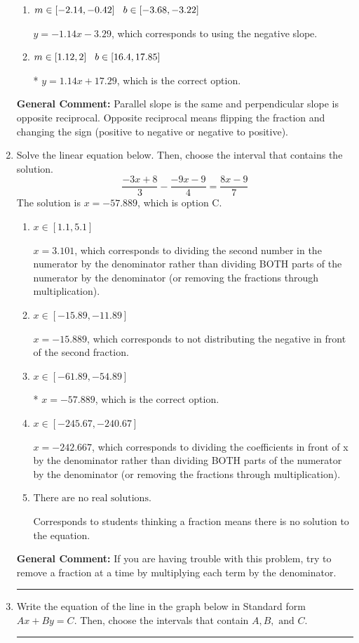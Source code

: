 \documentclass{extbook}[14pt]
\newcommand{\litem}[1]{\item #1

\rule{\textwidth}{0.4pt}}
\begin{document}
\begin{enumerate}
{\begin{enumerate}[label=\Alph*.]
 $y = 0.88x + 17.29$, which corresponds to using the reciprocal slope $(1/m)$.
\item \( m \in [-2.14, -0.42] \hspace*{3mm} b \in [-3.68, -3.22] \)

 $y = -1.14x - 3.29$, which corresponds to using the negative slope.
\item \( m \in [1.12, 2] \hspace*{3mm} b \in [16.4, 17.85] \)

* $y = 1.14x + 17.29$, which is the correct option.
\end{enumerate}

\textbf{General Comment:} Parallel slope is the same and perpendicular slope is opposite reciprocal. Opposite reciprocal means flipping the fraction and changing the sign (positive to negative or negative to positive).
}
\litem{
Solve the linear equation below. Then, choose the interval that contains the solution.
\[ \frac{-3x + 8}{3} - \frac{-9x -9}{4} = \frac{8x -9}{7} \]
The solution is \( x = -57.889 \), which is option C.\begin{enumerate}[label=\Alph*.]
\item \( x \in [1.1, 5.1] \)

 $x = 3.101$, which corresponds to dividing the second number in the numerator by the denominator rather than dividing BOTH parts of the numerator by the denominator (or removing the fractions through multiplication).
\item \( x \in [-15.89, -11.89] \)

 $x = -15.889$, which corresponds to not distributing the negative in front of the second fraction.
\item \( x \in [-61.89, -54.89] \)

* $x = -57.889$, which is the correct option.
\item \( x \in [-245.67, -240.67] \)

 $x = -242.667$, which corresponds to dividing the coefficients in front of x by the denominator rather than dividing BOTH parts of the numerator by the denominator (or removing the fractions through multiplication).
\item \( \text{There are no real solutions.} \)

Corresponds to students thinking a fraction means there is no solution to the equation.
\end{enumerate}

\textbf{General Comment:} If you are having trouble with this problem, try to remove a fraction at a time by multiplying each term by the denominator.
}
\litem{
Write the equation of the line in the graph below in Standard form $Ax+By=C$. Then, choose the intervals that contain $A, B, \text{ and } C$.

}
\end{enumerate}
\end{document}
